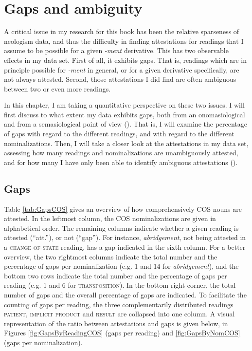 \chapter{Gaps and ambiguity}
\label{ch:observations}

A critical issue in my research for this book has been the relative sparseness of neologism data, and thus the difficulty in finding attestations for readings that I assume to be possible for a given \textit{-ment} derivative. 
This has two observable effects in my data set. First of all, it exhibits gaps. That is, readings which are in principle possible for \textit{-ment} in general, or for a given derivative specifically, are not always attested. 
Second, those attestations I did find are often ambiguous between two or even more readings.  

In this chapter, I am taking a quantitative perspective on these two issues.
I will first discuss to what extent my data exhibits gaps, both from an onomasiological and from a semasiological point of view (). That is, I will examine the percentage of gaps with regard to the different readings, and with regard to the different nominalizations. 
Then, I will take a closer look at the attestations in my data set, assessing how many readings and nominalizations are unambiguously attested, and for how many I have only been able to identify ambiguous attestations (). 

\section{Gaps}
\label{sec:obs-gaps}
 Table \ref{tab:GapsCOS} gives an overview of how comprehensively COS nouns are attested. In the leftmost column, the COS nominalizations are given in alphabetical order. The remaining columns indicate whether a given reading is attested (``att.''), or not (``gap''). For instance, \textit{abridgement}, not being attested in a \textsc{change-of-state} reading, has a gap indicated in the sixth column. For a better overview, the two rightmost columns indicate the total number and the percentage of gaps per nominalization (e.g. 1 and 14 for \textit{abridgement}), and the bottom two rows indicate the total number and the percentage of gaps per reading (e.g. 1 and 6 for \textsc{transposition}). In the bottom right corner, the total number of gaps and the overall percentage of gaps are indicated.
To facilitate the counting of gaps per reading, the three complementarily distributed readings \textsc{patient, implicit product} and \textsc{result} are collapsed into one column. 
A visual representation of the ratio between attestations and gaps is given below, in Figures \ref{fig:GapsByReadingCOS} (gaps per reading) and \ref{fig:GapsByNomCOS} (gaps per nominalization).

